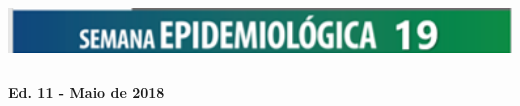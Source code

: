 \documentclass{article}
\begin{document}
\vfill
\hspace*{-0.7in}%
\includegraphics[width=9in,height=0.7in]
{Semana_Epidemiologica.png} %
\centering


\textbf{Ed. 11 - Maio de 2018}%
\end{document}
